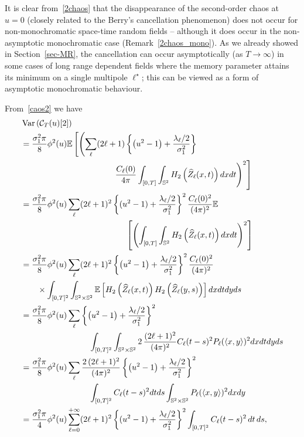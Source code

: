 \documentclass[AHL,Unicode,longabstracts,published]{cedram}
\newcommand{\clC}{\mathcal{C}}
\newcommand{\bbS}{\mathbb{S}}
\newcommand{\bbE}{\mathbb{E}}
\DeclareMathOperator{\Var}{Var}
\begin{document}
\begin{rema}
It is clear from~\eqref{2chaos} that the disappearance of the second-order chaos at $u=0$ (closely related to the Berry's cancellation phenomenon) does not occur for non-monochromatic space-time random fields -- although it does occur in the non-asymptotic monochromatic case (Remark~\ref {2chaos_mono}). As we already showed in Section~\ref{sec-MR}, the cancellation can occur asymptotically (as $T\rightarrow \infty $) in some cases of long range dependent fields where the memory parameter attains its minimum on a single multipole $\ell^{\star}$; this can be viewed as a form of asymptotic monochromatic behaviour.
\end{rema}

From~\eqref{caos2} we have
\begingroup
\allowdisplaybreaks
\begin{align}\label{varlunga2}
&\Var\left(\clC_{T}(u)[2]\right)\\
&=\frac{\sigma _{1}^{2}\pi }{8}\phi ^{2}(u)\bbE\left[\left(
\sum_{\ell }(2\ell +1)\left\{\left(u^{2}-1\right)+\frac{\lambda _{\ell }/2}{\sigma _{1}^{2}}\right\}\right.\right.\nonumber\\
&\mkern200mu\left.\left.\frac{C_{\ell }(0)}{4\pi }\int_{[0,T]}\int_{\bbS^{2}}H_{2}\left(\widehat{Z}_{\ell }(x,t)\right)dxdt\right) ^{2}\right]\nonumber\\
&=\frac{\sigma _{1}^{2}\pi }{8}\phi ^{2}(u)\sum_{\ell }(2\ell +1)^{2}\left\{ (u^{2}-1)+\frac{\lambda _{\ell }/2}{\sigma _{1}^{2}}\right\} ^{2}\frac{C_{\ell }(0)^{2}}{(4\pi)^{2}}\bbE\nonumber\\
&\mkern230mu\left[\left(
\int_{[0,T]}\int_{\bbS^{2}}H_{2}\left(\widehat{Z}_{\ell }(x,t)\right)dxdt\right) ^{2}\right]\nonumber\\
&=\frac{\sigma _{1}^{2}\pi }{8}\phi ^{2}(u)\sum_{\ell }(2\ell +1)^{2}\left\{\left(u^{2}-1\right)+\frac{\lambda _{\ell }/2}{\sigma _{1}^{2}}\right\} ^{2}\frac{C_{\ell }(0)^{2}}{(4\pi)^{2}}\nonumber\\
&\qquad\times \int_{[0,T]^{2}}\int_{\bbS^{2}\times \bbS^{2}}\bbE\left[H_{2}\left(\widehat{Z}_{\ell }(x,t)\right)H_{2}\left(\widehat{Z}_{\ell }(y,s)\right)\right] dxdtdyds\nonumber\\
&=\frac{\sigma _{1}^{2}\pi }{8}\phi ^{2}(u)\sum_{\ell }\left\{\left(u^{2}-1\right)+\frac{\lambda _{\ell }/2}{\sigma _{1}^{2}}\right\} ^{2}\nonumber\\
&\mkern150mu\int_{[0,T]^{2}}\int_{\bbS^{2}\times \bbS^{2}}2\,\frac{(2\ell +1)^{2}}{(4\pi)^{2}}C_{\ell }(t-s)^{2}P_{\ell }(\langle x,y\rangle)^{2}dxdtdyds\nonumber\\
&=\frac{\sigma _{1}^{2}\pi }{8}\phi ^{2}(u)\sum_{\ell }\frac{2\,(2\ell +1)^{2}}{(4\pi)^{2}}\left\{\left(u^{2}-1\right)+\frac{\lambda _{\ell }/2}{\sigma _{1}^{2}}\right\} ^{2}\nonumber\\
&\mkern150mu\int_{[0,T]^{2}}C_{\ell }(t-s)^{2}dtds\int_{\bbS^{2}\times \bbS^{2}}P_{\ell }(\langle x,y\rangle)^{2}dxdy\nonumber\\
&=\frac{\sigma _{1}^{2}\pi }{4}\phi ^{2}(u)\sum_{\ell =0}^{+\infty}(2\ell +1)^{2}\left\{ (u^{2}-1)+\frac{\lambda _{\ell }/2}{\sigma _{1}^{2}}\right\} ^{2}\int_{[0,T]^{2}}C_{\ell }(t-s)^{2}\,dt\,ds,\nonumber
\end{align}
\end{document}
